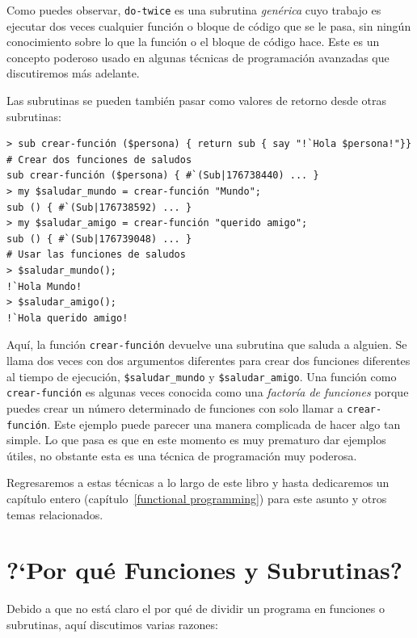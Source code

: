 Como puedes observar, \verb|do-twice| es una subrutina \emph{genérica}
cuyo trabajo es ejecutar dos veces cualquier función o bloque
de código que se le pasa, sin ningún conocimiento sobre lo que la 
función o el bloque de código hace. Este es un concepto poderoso
usado en algunas técnicas de programación avanzadas que discutiremos
más adelante.

Las subrutinas se pueden también pasar como valores de
retorno desde otras subrutinas:

\begin{lstlisting}
> sub crear-función ($persona) { return sub { say "!`Hola $persona!"}}
# Crear dos funciones de saludos
sub crear-función ($persona) { #`(Sub|176738440) ... }
> my $saludar_mundo = crear-función "Mundo";
sub () { #`(Sub|176738592) ... }
> my $saludar_amigo = crear-función "querido amigo";
sub () { #`(Sub|176739048) ... }
# Usar las funciones de saludos
> $saludar_mundo();
!`Hola Mundo!
> $saludar_amigo();
!`Hola querido amigo!
\end{lstlisting} 

Aquí, la función \verb|crear-función| devuelve una subrutina que saluda
a alguien. Se llama dos veces con dos argumentos diferentes para crear
dos funciones diferentes al tiempo de ejecución, \verb|$saludar_mundo|
y \verb|$saludar_amigo|. Una función como \verb|crear-función| es algunas
veces conocida como una \emph{factoría de funciones} porque puedes crear 
un número determinado de funciones con solo llamar a \verb|crear-función|. Este 
ejemplo puede parecer una manera complicada de hacer algo tan simple. 
Lo que pasa es que en este momento es muy prematuro dar ejemplos útiles,
no obstante esta es una técnica de programación muy poderosa.

Regresaremos a estas técnicas a lo largo de este libro y hasta dedicaremos
un capítulo entero (capítulo~\ref{functional programming}) 
para este asunto y otros temas relacionados.


\section{?`Por qué Funciones y Subrutinas?}

Debido a que no está claro el por qué de dividir un programa
en funciones o subrutinas, aquí discutimos varias razones:

